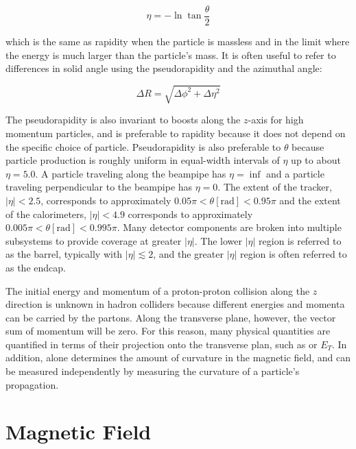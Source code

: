 \begin{equation}\label{eq:pseudorapidity}
\eta = - \ln \tan \frac{\theta}{2}
\end{equation}

\noindent which is the same as rapidity when the particle is massless and in the limit where the energy is much larger than the particle's mass.
It is often useful to refer to differences in solid angle using the pseudorapidity and the azimuthal angle:

\begin{equation}\label{eq:deltar}
\Delta R = \sqrt{\Delta \phi^2 + \Delta \eta^2}
\end{equation}


The pseudorapidity is also invariant to boosts along the $z$-axis for high momentum particles, and is preferable to rapidity because it does not depend on the specific choice of particle.
Pseudorapidity is also preferable to $\theta$ because particle production is roughly uniform in equal-width intervals of $\eta$ up to about $\eta = 5.0$. 
A particle traveling along the beampipe has $\eta = \inf$ and a particle traveling perpendicular to the beampipe has $\eta = 0$.
The extent of the tracker, $|\eta| < 2.5$, corresponds to approximately $0.05 \pi < \theta [\mathrm{rad}] < 0.95 \pi$ and the extent of the calorimeters, $|\eta| < 4.9$ corresponds to approximately $0.005 \pi < \theta [\mathrm{rad}] < 0.995 \pi$.
Many detector components are broken into multiple subsystems to provide coverage at greater $|\eta|$.
The lower $|\eta|$ region is referred to as the barrel, typically with $|\eta| \lesssim 2$, and the greater $|\eta|$ region is often referred to as the endcap.

The initial energy and momentum of a proton-proton collision along the $z$ direction is unknown in hadron colliders because different energies and momenta can be carried by the partons.
Along the transverse plane, however, the vector sum of momentum will be zero.
For this reason, many physical quantities are quantified in terms of their projection onto the transverse plan, such as \pt or $E_T$.
In addition, \pt alone determines the amount of curvature in the magnetic field, and can be measured independently by measuring the curvature of a particle's propagation.


\section{Magnetic Field}
\label{sec:magnetic_field}


